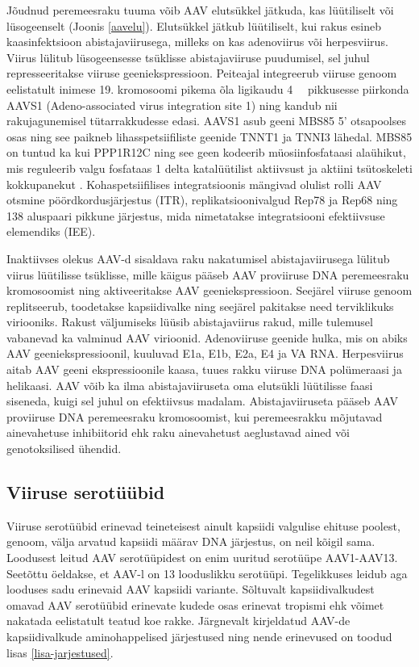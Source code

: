 \documentclass{trkut}%
\begin{document}
Jõudnud peremeesraku tuuma võib AAV elutsükkel jätkuda, kas lüütiliselt või lüsogeenselt (Joonis \ref{aavelu}). Elutsükkel jätkub lüütiliselt, kui rakus esineb kaasinfektsioon abistajaviirusega, milleks on kas adenoviirus või herpesviirus. Viirus lülitub lüsogeensesse tsüklisse abistajaviiruse puudumisel, sel juhul represseeritakse viiruse geeniekspressioon. Peiteajal integreerub viiruse genoom eelistatult inimese 19. kromosoomi pikema õla ligikaudu \SI{4}{\kilo\base} pikkusesse piirkonda AAVS1 (Adeno-associated virus integration site 1) ning kandub nii rakujagunemisel tütarrakkudesse edasi. AAVS1 asub geeni MBS85 5' otsapoolses osas ning see paikneb lihasspetsiifiliste geenide TNNT1 ja TNNI3 lähedal. MBS85 on tuntud ka kui PPP1R12C ning see geen kodeerib müosiinfosfataasi alaühikut, mis reguleerib valgu fosfataas 1 delta katalüütilist aktiivsust ja aktiini tsütoskeleti kokkupanekut \parencite{PPP1R12C}. Kohaspetsiifilises integratsioonis mängivad olulist rolli AAV otsmine pöördkordusjärjestus (ITR), replikatsioonivalgud Rep78 ja Rep68 ning 138 aluspaari pikkune järjestus, mida nimetatakse integratsiooni efektiivsuse elemendiks (IEE). \parencite{elutsükkel}

Inaktiivses olekus AAV-d sisaldava raku nakatumisel abistajaviirusega lülitub viirus lüütilisse tsüklisse, mille käigus pääseb AAV proviiruse DNA peremeesraku kromosoomist ning aktiveeritakse AAV geeniekspressioon. Seejärel viiruse genoom replitseerub, toodetakse kapsiidivalke ning seejärel pakitakse need terviklikuks viriooniks. Rakust väljumiseks lüüsib abistajaviirus rakud, mille tulemusel vabanevad ka valminud AAV virioonid. Adenoviiruse geenide hulka, mis on abiks AAV geeniekspressioonil, kuuluvad E1a, E1b, E2a, E4 ja VA RNA. Herpesviirus aitab AAV geeni ekspressioonile kaasa, tuues rakku viiruse DNA polümeraasi ja helikaasi. AAV võib ka ilma abistajaviiruseta oma elutsükli lüütilisse faasi siseneda, kuigi sel juhul on efektiivsus madalam. Abistajaviiruseta pääseb AAV proviiruse DNA peremeesraku kromosoomist, kui peremeesrakku mõjutavad ainevahetuse inhibiitorid ehk raku ainevahetust aeglustavad ained või genotoksilised ühendid. \parencite{elutsükkel}
 
\subsection{Viiruse serotüübid}

Viiruse serotüübid erinevad teineteisest ainult kapsiidi valgulise ehituse poolest, genoom, välja arvatud kapsiidi määrav DNA järjestus, on neil kõigil sama. Loodusest leitud AAV serotüüpidest on enim uuritud serotüüpe AAV1-AAV13. Seetõttu öeldakse, et AAV-l on 13 looduslikku serotüüpi. Tegelikkuses leidub aga looduses sadu erinevaid AAV kapsiidi variante. Sõltuvalt kapsiidivalkudest omavad AAV serotüübid erinevate kudede osas erinevat tropismi ehk võimet nakatada eelistatult teatud koe rakke. \parencite{pupo} Järgnevalt kirjeldatud AAV-de kapsiidivalkude aminohappelised järjestused ning nende erinevused on  toodud lisas \ref{lisa-jarjestused}.
\end{document}
